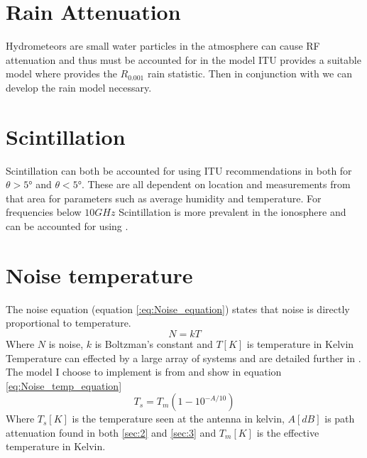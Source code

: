 \documentclass[conference]{IEEEtran}
\begin{document}
\label{sec:3}

\section{Rain Attenuation}
Hydrometeors are small water particles in the atmosphere can cause RF attenuation and thus must be accounted for in the model ITU provides a suitable model where \cite{ITU-R_P.837-1} provides the $R_{0.001}$ rain statistic. Then in conjunction with \cite{ITU-R_P.618-7} we can develop the rain model necessary.\\

\label{sec:4}


\section{Scintillation}
Scintillation can both be accounted for using ITU recommendations in \cite{ITU-R_P.618-7} both for $\theta> 5°$ and $\theta < 5°$. These are all dependent on location and measurements from that area for parameters such as average humidity and temperature. For frequencies below $10G Hz$ Scintillation is more prevalent in the ionosphere and can be accounted for using \cite{ITU-R_P.531-14}.\\


\label{sec:5}

\section{Noise temperature}
The noise equation (equation \ref{:eq:Noise_equation}) states that noise is directly proportional to temperature. 
\begin{equation}
N = kT
\label{:eq:Noise_equation}
\end{equation}
Where $N$ is noise, $k$ is Boltzman's constant and $T[K]$ is temperature in Kelvin\\

Temperature can effected by a large array of systems and are detailed further in \cite{ITU-R_P.372-16}. The model I choose to implement is from \cite{ITU-R_P.618-7} and show in equation \ref{eq:Noise_temp_equation}
\begin{equation}
T_s = T_m(1-10^{-A/10})
\label{eq:Noise_temp_equation}
\end{equation}
Where $T_s[K]$ is the temperature seen at the antenna in kelvin, $A[dB]$ is path attenuation found in both \ref{sec:2} and \ref{sec:3} and $T_m [K]$ is the effective temperature in Kelvin.\\
\end{document}
